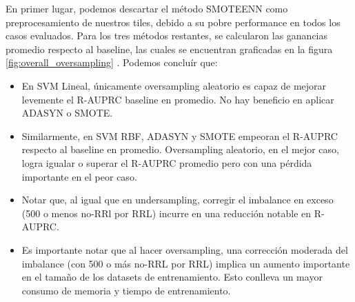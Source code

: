 En primer lugar, podemos descartar el método SMOTEENN como preprocesamiento de nuestros tiles, debido a su pobre performance en todos los casos evaluados. Para los tres métodos restantes, se calcularon las ganancias promedio respecto al baseline, las cuales se encuentran graficadas en la figura \ref{fig:overall_oversampling} . Podemos concluír que:
\begin{itemize}
\item En SVM Lineal, únicamente oversampling aleatorio es capaz de mejorar levemente el R-AUPRC baseline en promedio. No hay beneficio en aplicar ADASYN o SMOTE.
\item Similarmente, en SVM RBF, ADASYN y SMOTE empeoran el R-AUPRC respecto al baseline en promedio. Oversampling aleatorio, en el mejor caso, logra igualar o superar el R-AUPRC promedio pero con una pérdida importante en el peor caso.
\item Notar que, al igual que en undersampling, corregir el imbalance en exceso (500 o menos no-RRl por RRL) incurre en una reducción notable en R-AUPRC.
\item Es importante notar que al hacer oversampling, una corrección moderada del imbalance (con 500 o más no-RRL por RRL) implica un aumento importante en el tamaño de los datasets de entrenamiento. Esto conlleva un mayor consumo de memoria y tiempo de entrenamiento.
\end{itemize}

